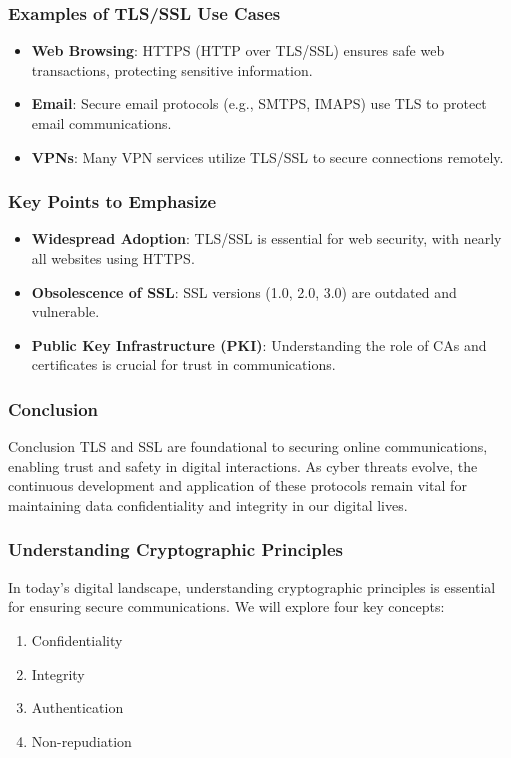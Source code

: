 \documentclass{beamer}
\begin{document}
\begin{frame}[fragile]
    \frametitle{Examples of TLS/SSL Use Cases}
    \begin{itemize}
        \item \textbf{Web Browsing}: HTTPS (HTTP over TLS/SSL) ensures safe web transactions, protecting sensitive information.
        \item \textbf{Email}: Secure email protocols (e.g., SMTPS, IMAPS) use TLS to protect email communications.
        \item \textbf{VPNs}: Many VPN services utilize TLS/SSL to secure connections remotely.
    \end{itemize}
\end{frame}

\begin{frame}[fragile]
    \frametitle{Key Points to Emphasize}
    \begin{itemize}
        \item \textbf{Widespread Adoption}: TLS/SSL is essential for web security, with nearly all websites using HTTPS.
        \item \textbf{Obsolescence of SSL}: SSL versions (1.0, 2.0, 3.0) are outdated and vulnerable.
        \item \textbf{Public Key Infrastructure (PKI)}: Understanding the role of CAs and certificates is crucial for trust in communications.
    \end{itemize}
\end{frame}

\begin{frame}[fragile]
    \frametitle{Conclusion}
    \begin{block}{Conclusion}
        TLS and SSL are foundational to securing online communications, enabling trust and safety in digital interactions.
        As cyber threats evolve, the continuous development and application of these protocols remain vital for maintaining data confidentiality and integrity in our digital lives.
    \end{block}
\end{frame}

\begin{frame}[fragile]
    \frametitle{Understanding Cryptographic Principles}
    In today’s digital landscape, understanding cryptographic principles is essential for ensuring secure communications. 
    We will explore four key concepts: 
    \begin{enumerate}
        \item Confidentiality
        \item Integrity
        \item Authentication
        \item Non-repudiation
    \end{enumerate}
\end{frame}
\end{document}
